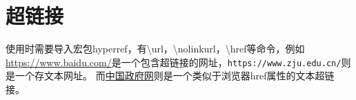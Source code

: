 \section{超链接}
使用时需要导入宏包hyperref，有\textbackslash url，\textbackslash nolinkurl，\textbackslash href等命令，例如
\url{https://www.baidu.com/}是一个包含超链接的网址，\nolinkurl{https://www.zju.edu.cn/}则是一个存文本网址。
而\href{https://www.gov.cn}{中国政府网}则是一个类似于浏览器href属性的文本超链接。